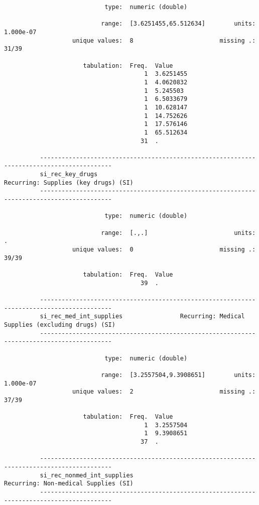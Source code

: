 \documentclass{article}
\begin{document}
\begin{verbatim}
                            type:  numeric (double)
          
                           range:  [3.6251455,65.512634]        units:  1.000e-07
                   unique values:  8                        missing .:  31/39
          
                      tabulation:  Freq.  Value
                                       1  3.6251455
                                       1  4.0620832
                                       1  5.245503
                                       1  6.5033679
                                       1  10.628147
                                       1  14.752626
                                       1  17.576146
                                       1  65.512634
                                      31  .
          
          ------------------------------------------------------------------------------------------
          si_rec_key_drugs                                      Recurring: Supplies (key drugs) (SI)
          ------------------------------------------------------------------------------------------
          
                            type:  numeric (double)
          
                           range:  [.,.]                        units:  .
                   unique values:  0                        missing .:  39/39
          
                      tabulation:  Freq.  Value
                                      39  .
          
          ------------------------------------------------------------------------------------------
          si_rec_med_int_supplies                Recurring: Medical Supplies (excluding drugs) (SI)
          ------------------------------------------------------------------------------------------
          
                            type:  numeric (double)
          
                           range:  [3.2557504,9.3908651]        units:  1.000e-07
                   unique values:  2                        missing .:  37/39
          
                      tabulation:  Freq.  Value
                                       1  3.2557504
                                       1  9.3908651
                                      37  .
          
          ------------------------------------------------------------------------------------------
          si_rec_nonmed_int_supplies                            Recurring: Non-medical Supplies (SI)
          ------------------------------------------------------------------------------------------
          

\end{verbatim}
\end{document}
